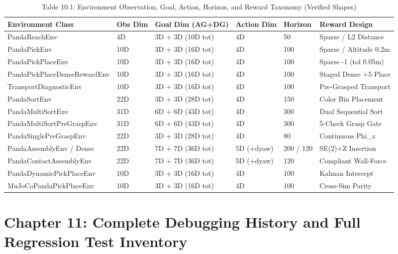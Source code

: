 \documentclass[11pt,a4paper,oneside]{book}
\begin{document}
\begin{longtable}{l l l l l l}\caption{Table 10.1: Environment Observation, Goal, Action, Horizon, and Reward Taxonomy (Verified Shapes)}\\\toprule
Environment Class & Obs Dim & Goal Dim (AG+DG) & Action Dim & Horizon & Reward Design \\ \midrule \endhead
PandaReachEnv & 4D & 3D + 3D (10D tot) & 4D & 50 & Sparse / L2 Distance \\
PandaPickEnv & 10D & 3D + 3D (16D tot) & 4D & 100 & Sparse / Altitude 0.2m \\
PandaPickPlaceEnv & 10D & 3D + 3D (16D tot) & 4D & 100 & Sparse -1 (tol 0.05m) \\
PandaPickPlaceDenseRewardEnv & 10D & 3D + 3D (16D tot) & 4D & 100 & Staged Dense +5 Place \\
TransportDiagnosticEnv & 10D & 3D + 3D (16D tot) & 4D & 100 & Pre-Grasped Transport \\
PandaSortEnv & 22D & 3D + 3D (28D tot) & 4D & 150 & Color Bin Placement \\
PandaMultiSortEnv & 31D & 6D + 6D (43D tot) & 4D & 300 & Dual Sequential Sort \\
PandaMultiSortPreGraspEnv & 31D & 6D + 6D (43D tot) & 4D & 300 & 5-Check Grasp Gate \\
PandaSinglePreGraspEnv & 22D & 3D + 3D (28D tot) & 4D & 80 & Continuous Phi\_z \\
PandaAssemblyEnv / Dense & 22D & 7D + 7D (36D tot) & 5D (+dyaw) & 200 / 120 & SE(2)+Z Insertion \\
PandaContactAssemblyEnv & 22D & 7D + 7D (36D tot) & 5D (+dyaw) & 120 & Compliant Wall-Force \\
PandaDynamicPickPlaceEnv & 10D & 3D + 3D (16D tot) & 4D & 100 & Kalman Intercept \\
MuJoCoPandaPickPlaceEnv & 10D & 3D + 3D (16D tot) & 4D & 100 & Cross-Sim Parity \\
\bottomrule \end{longtable}
\chapter{Chapter 11: Complete Debugging History and Full Regression Test Inventory}
\end{document}
